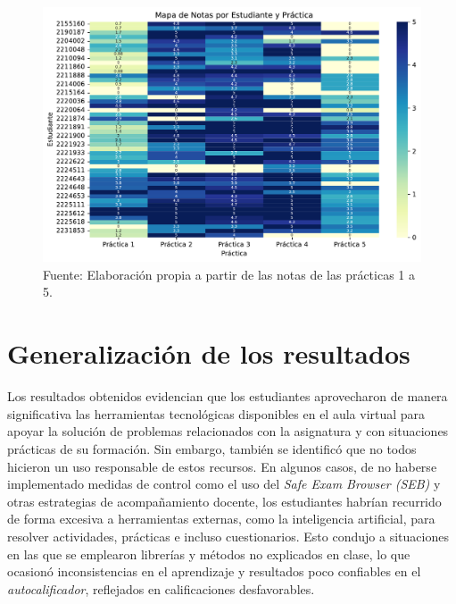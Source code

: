 \documentclass[letter,oneside,12pt,spanish]{report}
\begin{document}
\begin{figure}[ht]
	\centering
	\includegraphics[width=1\textwidth]{Figs/Mapa_Notas.pdf}
	\label{fig:Mapa}
	\\Fuente: Elaboración propia a partir de las notas de las prácticas 1 a 5.
\end{figure}

\section{Generalización de los resultados}

Los resultados obtenidos evidencian que los estudiantes aprovecharon de manera significativa las herramientas tecnológicas disponibles en el aula virtual para apoyar la solución de problemas relacionados con la asignatura y con situaciones prácticas de su formación. Sin embargo, también se identificó que no todos hicieron un uso responsable de estos recursos. En algunos casos, de no haberse implementado medidas de control como el uso del \textit{Safe Exam Browser (SEB)} y otras estrategias de acompañamiento docente, los estudiantes habrían recurrido de forma excesiva a herramientas externas, como la inteligencia artificial, para resolver actividades, prácticas e incluso cuestionarios. Esto condujo a situaciones en las que se emplearon librerías y métodos no explicados en clase, lo que ocasionó inconsistencias en el aprendizaje y resultados poco confiables en el \textit{autocalificador}, reflejados en calificaciones desfavorables.
\end{document}
